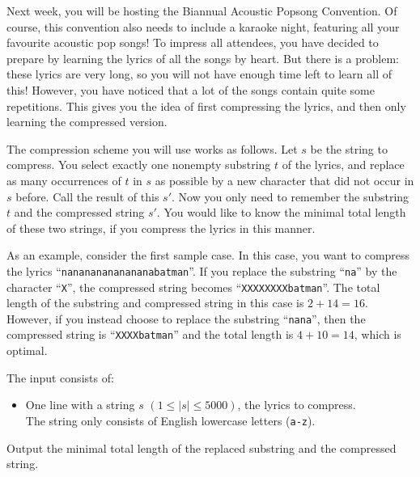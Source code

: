 \problemname{}


\newcommand{\substringmaxl}{5000}

Next week, you will be hosting the Biannual Acoustic Popsong Convention.
Of course, this convention also needs to include a karaoke night, featuring all your favourite acoustic pop songs!
To impress all attendees, you have decided to prepare by learning the lyrics of all the songs by heart.
But there is a problem: these lyrics are very long,
so you will not have enough time left to learn all of this!
However, you have noticed that a lot of the songs contain quite some repetitions.
This gives you the idea of first compressing the lyrics, and then only learning the compressed version.

The compression scheme you will use works as follows.
Let $s$ be the string to compress.
You select exactly one nonempty substring $t$ of the lyrics,
and replace as many occurrences of $t$ in $s$ as possible by a new character that did not occur in $s$ before.
Call the result of this $s'$.
Now you only need to remember the substring $t$ and the compressed string $s'$.
You would like to know the minimal total length of these two strings, if you compress the lyrics in this manner.

As an example, consider the first sample case.
In this case, you want to compress the lyrics ``\texttt{nanananananananabatman}''.
If you replace the substring ``\texttt{na}'' by the character ``\texttt{X}'',
the compressed string becomes ``\texttt{XXXXXXXXbatman}''.
The total length of the substring and compressed string in this case is $2 + 14 = 16$.
However, if you instead choose to replace the substring ``\texttt{nana}'',
then the compressed string is ``\texttt{XXXXbatman}''
and the total length is $4 + 10 = 14$, which is optimal.

\begin{Input}
    The input consists of:
    \begin{itemize}
        \item One line with a string $s$ $(1 \leq |s| \leq \substringmaxl)$,
        the lyrics to compress. \\
        The string only consists of English lowercase letters (\texttt{a-z}).
    \end{itemize}
\end{Input}

\begin{Output}
    Output the minimal total length of the replaced substring and the compressed string.
\end{Output}
